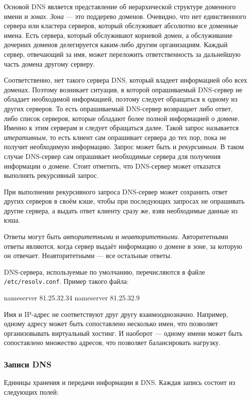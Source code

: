 Основой DNS является представление об иерархической структуре доменного имени и \emph{зонах}. \emph{Зона} — это поддерево доменов. Очевидно, что нет единственного сервера или кластера серверов, который обслуживает абсолютно все доменные имена. Есть сервера, который обслуживают корневой домен, а обслуживание дочерних доменов делегируется каким-либо другим организациям. Каждый сервер, отвечающий за имя, может переложить ответственность за дальнейшую часть домена другому серверу.

Соответственно, нет такого сервера DNS, который владеет информацией обо всех доменах. Поэтому возникает ситуация, в которой опрашиваемый DNS-сервер не обладает необходимой информацией, поэтому следует обращаться к одному из других серверов. То есть опрашиваемый DNS-сервер возвращает либо ответ, либо список серверов, которые обладают более полной информацией о домене. Именно к этим серверам и следует обращаться далее. Такой запрос называется \emph{итеративным}, то есть клиент сам опрашивает сервера до тех пор, пока не получит необходимую информацию. Запрос может быть и \emph{рекурсивным}. В таком случае DNS-сервер сам опрашивает необходимые сервера для получения информации о домене. Стоит отметить, что DNS-сервер может отказатся выполнять рекурсивный запрос.

При выполнении рекурсивного запроса DNS-сервер может сохранить ответ других серверов в своём кэше, чтобы при последующих запросах не опрашивать другие сервера, а выдать ответ клиенту сразу же, взяв необходимые данные из кэша.

Ответы могут быть \emph{авторитетными} и \emph{неавторитетными}. Авторитетными ответы являются, когда сервер выдаёт информацию о домене в зоне, за которую он отвечает. Неавторитетными — все остальные ответы.

DNS-сервера, используемые по умолчанию, перечисляются в файле \lstinline{/etc/resolv.conf}. Пример такого файла:
\begin{plainlst}{}{}
nameserver 81.25.32.34
nameserver 81.25.32.9
\end{plainlst}

Имя и IP-адрес не соответствуют друг другу взаимооднозначно. Например, одному адресу может быть сопоставлено несколько имен, что позволяет организовывать виртуальный хостинг. И наоборот --- одному имени может быть сопоставлено множество адресов, что позволяет балансировать нагрузку.

\subsubsection{Записи DNS}
Единицы хранения и передачи информации в DNS. Каждая запись состоит из следующих полей:

